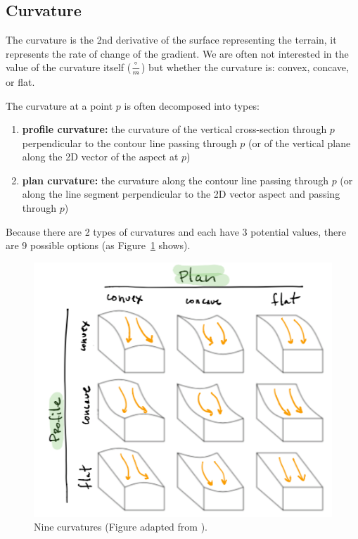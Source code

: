 %
\subsection{Curvature}%

The curvature is the 2nd derivative of the surface representing the terrain, it represents the rate of change of the gradient.%
We are often not interested in the value of the curvature itself ($\frac{\degree}{m}$) but whether the curvature is: convex, concave, or flat.

The curvature at a point $p$ is often decomposed into types:
\begin{enumerate}
  \item \textbf{profile curvature:} the curvature of the vertical cross-section through $p$ perpendicular to the contour line passing through $p$ (or of the vertical plane along the 2D vector of the aspect at $p$)
  \item \textbf{plan curvature:} the curvature along the contour line passing through $p$ (or along the line segment perpendicular to the 2D vector aspect and passing through $p$)
\end{enumerate} 
Because there are 2 types of curvatures and each have 3 potential values, there are 9 possible options (as Figure~\ref{fig:curvatures} shows).
\begin{figure}
  \centering
  \includegraphics[width=0.9\linewidth]{figs/curvatures}
  \caption{Nine curvatures (Figure adapted from \citet{vanKreveld97}).}%
\label{fig:curvatures}
\end{figure}


